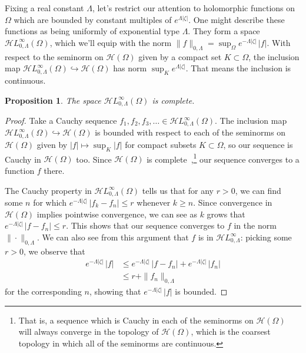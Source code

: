 \documentclass{article}
\theoremstyle{plain}
\newtheorem{prop}{Proposition}
\newcommand{\holo}{\mathcal{H}}
\newcommand{\singexp}[2]{\mathcal{H}L^\infty_{#1, #2}}
\begin{document}
Fixing a real constant $\Lambda$, let's restrict our attention to holomorphic functions on $\Omega$ which are bounded by constant multiples of $e^{\Lambda|\zeta|}$. One might describe these functions as being uniformly of exponential type $\Lambda$. They form a space $\singexp{0}{\Lambda}(\Omega)$, which we'll equip with the norm $\|f\|_{0,\Lambda} = \sup_\Omega e^{-\Lambda|\zeta|}\,|f|$. With respect to the seminorm on $\holo(\Omega)$ given by a compact set $K \subset \Omega$, the inclusion map $\singexp{0}{\Lambda}(\Omega) \hookrightarrow \holo(\Omega)$ has norm $\sup_K e^{\Lambda |\zeta|}$. That means the inclusion is continuous.
\begin{prop}\label{exp-complete}
The space $\singexp{0}{\Lambda}(\Omega)$ is complete.
\end{prop}
\begin{proof}
Take a Cauchy sequence $f_1, f_2, f_3, \ldots \in \singexp{0}{\Lambda}(\Omega)$. The inclusion map $\singexp{0}{\Lambda}(\Omega) \hookrightarrow \holo(\Omega)$ is bounded with respect to each of the seminorms on $\holo(\Omega)$ given by $|f| \mapsto \sup_K |f|$ for compact subsets $K \subset \Omega$, so our sequence is Cauchy in $\holo(\Omega)$ too. Since $\holo(\Omega)$ is complete~\cite[Proposition~3.5]{fnl-cpx-anal},\footnote{That is, a sequence which is Cauchy in each of the seminorms on $\holo(\Omega)$ will always converge in the topology of $\holo(\Omega)$, which is the coarsest topology in which all of the seminorms are continuous.} our sequence converges to a function $f$ there.

The Cauchy property in $\singexp{0}{\Lambda}(\Omega)$ tells us that for any $r > 0$, we can find some $n$ for which $e^{-\Lambda |\zeta|}\,|f_k - f_n| \le r$ whenever $k \ge n$. Since convergence in $\holo(\Omega)$ implies pointwise convergence, we can see as $k$ grows that $e^{-\Lambda |\zeta|}\,|f - f_n| \le r$. This shows that our sequence converges to $f$ in the norm $\|\cdot\|_{0,\Lambda}$. We can also see from this argument that $f$ is in $\singexp{0}{\Lambda}$: picking some $r > 0$, we observe that
\begin{align*}
e^{-\Lambda |\zeta|}\,|f| & \le e^{-\Lambda |\zeta|}\,|f - f_n| + e^{-\Lambda |\zeta|}\,|f_n| \\
& \le r + \|f_n\|_{0,\Lambda}
\end{align*}
for the corresponding $n$, showing that $e^{-\Lambda |\zeta|}\,|f|$ is bounded.

\end{proof}
\end{document}
